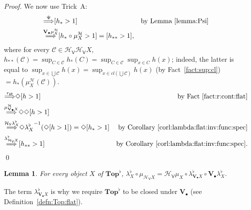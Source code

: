 \documentclass[preprint,12pt]{elsarticle}
\newcommand\Angel{{\mathtt{A}}}
\newcommand\Nature{{\mathtt{P}}}
\newcommand\AN{{\Angel\Nature}}
\newcommand\invto[1]{{\buildrel {#1} \over\Longrightarrow}}
\newcommand\Hoare{{\mathcal H}}
\newcommand\Vt{\mathsf{V}}
\newcommand\HV{\Hoare_\Vt}
\newcommand\Val{{\mathbf V}}
\newcommand\Topcat{\mathbf{Top}}
\newtheorem{lemma}[theorem]{Lemma}
\begin{document}
\begin{proof}
  We now use Trick~A:
  \begin{align*}
    [h > 1]
    & \invto{\Psi} [h_* > 1]
    & \text{by Lemma~\ref{lemma:Psi}} \\
    & \invto{\Val_\bullet {\mu^\Hoare_X}}
      [h_* \circ \mu^\Hoare_X > 1] = [h_{**} > 1],
  \end{align*}
  where for every $\mathcal C \in \HV {\HV X}$,
  $h_{**} (\mathcal C) = \sup_{C \in \mathcal C} h_* (C) = \sup_{C \in
    \mathcal C} \sup_{x \in C} h (x)$; indeed, the latter is equal to
  $\sup_{x \in \bigcup \mathcal C} h (x) = \sup_{x \in cl (\bigcup
    \mathcal C)} h (x)$ (by Fact~\ref{fact:sup:cl})
  $= h_* (\mu^\Hoare_X (\mathcal C))$.
  \begin{align*}
    [h > 1]
    & \invto{r_\AN}
      \Diamond {[h > 1]}
    & \text{by Fact~\ref{fact:r:cont:flat}} \\
    & \invto{\mu^\Hoare_{\Val_\bullet X}}
      \Diamond {\Diamond {[h > 1]}} \\
    & \invto{\HV {{\lambda^\flat_X}}}
      \Diamond {{\lambda^\flat_X}^{-1} (\Diamond {[h > 1]})}
      = \Diamond {[h_* > 1]}
    & \text{by Corollary~\ref{corl:lambda:flat:inv:func:spec}}\\
    & \invto{\lambda^\flat_{\HV X}}
      [h_{**} > 1]
    & \text{by Corollary~\ref{corl:lambda:flat:inv:func:spec}}.
  \end{align*}
  \qed
\end{proof}

\begin{lemma}
  \label{lemma:lambda:flat:muT}
  For every object $X$ of $\Topcat^\flat$,
  ${\lambda^\flat_X} \circ \mu_{\HV X} = \HV {\mu_X} \circ
  \lambda^\flat_{\Val_\bullet X} \circ \Val_\bullet
  {\lambda^\flat_X}$.
\end{lemma}
The term $\lambda^\flat_{\Val_\bullet X}$ is why we require
$\Topcat^\flat$ to be closed under $\Val_\bullet$ (see
Definition~\ref{defn:Top:flat}).
\end{document}
